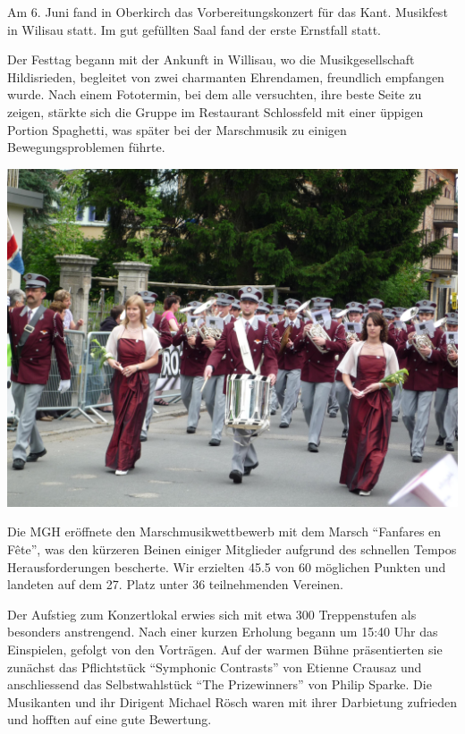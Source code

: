 \begin{history}

    Am 6. Juni fand in Oberkirch das Vorbereitungskonzert für das Kant.
    Musikfest in Wilisau statt. Im gut gefüllten Saal fand der erste Ernstfall
    statt.

    Der Festtag begann mit der Ankunft in Willisau, wo die Musikgesellschaft
    Hildisrieden, begleitet von zwei charmanten Ehrendamen, freundlich empfangen
    wurde. Nach einem Fototermin, bei dem alle versuchten, ihre beste Seite zu
    zeigen, stärkte sich die Gruppe im Restaurant Schlossfeld mit einer üppigen
    Portion Spaghetti, was später bei der Marschmusik zu einigen
    Bewegungsproblemen führte.

    \begin{MulticolFigure}
        \centering
        \includegraphics[width=0.93\linewidth]{./chap/2001-2024/2010/MGH-Marschmusik-Willisau-2010.jpg}
    \end{MulticolFigure}

    Die MGH eröffnete den Marschmusikwettbewerb mit dem Marsch \enquote{Fanfares
        en Fête}, was den kürzeren Beinen einiger Mitglieder aufgrund des
    schnellen Tempos Herausforderungen bescherte. Wir erzielten 45.5 von 60
    möglichen Punkten und landeten auf dem 27. Platz unter 36 teilnehmenden
    Vereinen.


    Der Aufstieg zum Konzertlokal erwies sich mit etwa 300 Treppenstufen als
    besonders anstrengend. Nach einer kurzen Erholung begann um 15:40 Uhr das
    Einspielen, gefolgt von den Vorträgen. Auf der warmen Bühne präsentierten
    sie zunächst das Pflichtstück \enquote{Symphonic Contrasts} von Etienne
    Crausaz und anschliessend das Selbstwahlstück \enquote{The Prizewinners} von
    Philip Sparke. Die Musikanten und ihr Dirigent Michael Rösch waren mit ihrer
    Darbietung zufrieden und hofften auf eine gute Bewertung.


\end{history}

